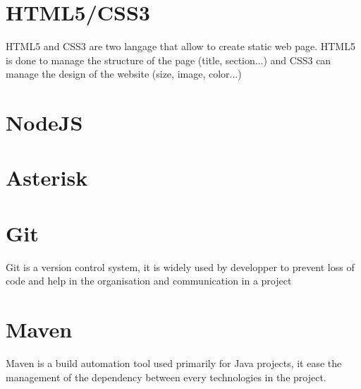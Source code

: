 \section{HTML5/CSS3}

HTML5 and CSS3 are two langage that allow to create static web page.
HTML5 is done to manage the structure of the page (title, section...) and CSS3 can manage the design of the website (size, image, color...)


\section{NodeJS}



\section{Asterisk}



\section{Git}

Git is a version control system, it is widely used by developper to prevent loss of code and help in the organisation and communication in a project


\section{Maven}

Maven is a build automation tool used primarily for Java projects, it ease the management of the dependency between every technologies in the project.


\newpage